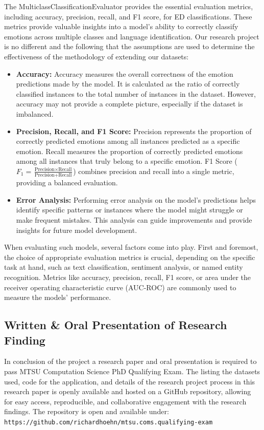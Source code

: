 \documentclass[11pt]{article}
\begin{document}
The MulticlassClassificationEvaluator provides the essential evaluation metrics, including accuracy, precision, recall, and F1 score, for ED classifications. These metrics provide valuable insights into a model's ability to correctly classify emotions across multiple classes and language identification. Our research project is no different and the following that the assumptions are used to determine the effectiveness of the methodology of extending our datasets:
\begin{itemize}

\item \textbf{Accuracy:} Accuracy measures the overall correctness of the emotion predictions made by the model. It is calculated as the ratio of correctly classified instances to the total number of instances in the dataset. However, accuracy may not provide a complete picture, especially if the dataset is imbalanced.

\item \textbf{Precision, Recall, and F1 Score:} Precision represents the proportion of correctly predicted emotions among all instances predicted as a specific emotion. Recall measures the proportion of correctly predicted emotions among all instances that truly belong to a specific emotion. F1 Score ($F_{1}=\frac{\text{Precision} \times \text{Recall}}{\text{Precision} + \text{Recall}}$) combines precision and recall into a single metric, providing a balanced evaluation.

\item \textbf{Error Analysis:} Performing error analysis on the model's predictions helps identify specific patterns or instances where the model might struggle or make frequent mistakes. This analysis can guide improvements and provide insights for future model development.
\end{itemize}

When evaluating such models, several factors come into play. First and foremost, the choice of appropriate evaluation metrics is crucial, depending on the specific task at hand, such as text classification, sentiment analysis, or named entity recognition. Metrics like accuracy, precision, recall, F1 score, or area under the receiver operating characteristic curve (AUC-ROC) are commonly used to measure the models' performance.

\subsection{Written \& Oral Presentation of Research Finding}
In conclusion of the project a research paper and oral presentation is required to pass MTSU Computation Science PhD Qualifying Exam. The listing the datasets used, code for the application, and details of the research project process in this research paper is openly available and hosted on a GitHub repository, allowing for easy access, reproducible, and collaborative engagement with the research findings. The repository is open and available under: \texttt{https://github.com/richardhoehn/mtsu.coms.qualifying-exam}\cite{Hoehn_Improving_Emotion_Detection_2023}
\end{document}
